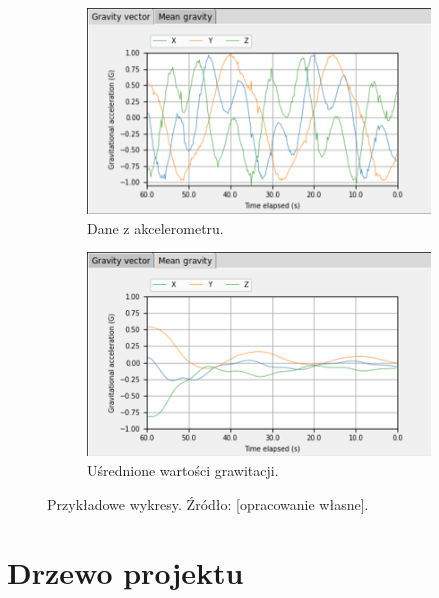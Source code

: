 \begin{figure}[h]
	\centering
	
	\begin{subfigure}[h]{.49\textwidth}
		\centering
		\includegraphics[scale=1.7]{grav_surowe}
		\caption{Dane z akcelerometru.}
		\label{fig:grav_raw}
	\end{subfigure}
	\hfill%
	\begin{subfigure}[h]{.49\textwidth}
		\centering
		\includegraphics[scale=1.7]{grav_sr}
		\caption{Uśrednione wartości grawitacji.} 
		\label{fig:grav_mean}
	\end{subfigure}
	
	\caption{Przykładowe wykresy. Źródło: [opracowanie własne].}
	\label{fig:wykresy_gui}
	
\end{figure}

\section{Drzewo projektu}

